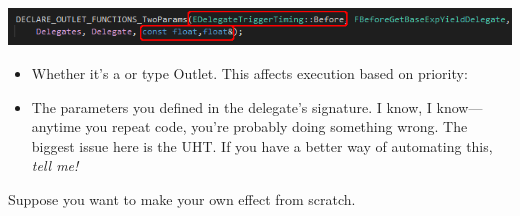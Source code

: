 \begin{enumerate}
{\begin{center}
		\includegraphics[scale=2]{create-outlet-functions}
	\end{center}
		\begin{itemize}
			\item{Whether it's a  or  type Outlet. This affects execution based on priority:
			}
			\item{The parameters you defined in the delegate's signature. I know, I know---anytime you repeat code, you're probably doing something wrong. The biggest issue here is the UHT. If you have a better way of automating this, \textit{tell me!}}
		\end{itemize}
	}
\end{enumerate}


Suppose you want to make your own effect from scratch. 

